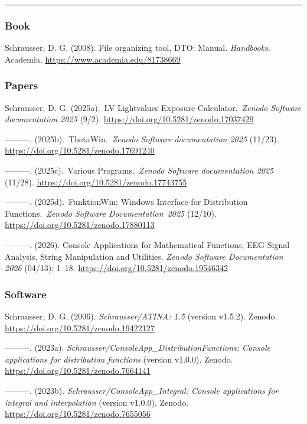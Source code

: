 \documentclass[
]{article}
\begin{document}
\begin{center}\rule{0.5\linewidth}{0.5pt}\end{center}

\hypertarget{book-1}{%
\subsubsection{Book}\label{book-1}}

Schrausser, D. G. (2008). File organizing tool, DTO: Manual.
\emph{Handbooks}. Academia. \url{https://www.academia.edu/81738669}

\hypertarget{papers-4}{%
\subsubsection{Papers}\label{papers-4}}

Schrausser, D. G. (2025a).~LV Lightvalues Exposure
Calculator.~\emph{Zenodo Software documentation 2025} (9/2).
\url{https://doi.org/10.5281/zenodo.17037429}

---------. (2025b).~ThetaWin.~\emph{Zenodo Software documentation 2025}
(11/23). \url{https://doi.org/10.5281/zenodo.17691240}

---------. (2025c).~Various Programs.~\emph{Zenodo Software
documentation 2025} (11/28).
\url{https://doi.org/10.5281/zenodo.17743755}

---------. (2025d).~FunktionWin: Windows Interface for Distribution
Functions.~\emph{Zenodo Software Documentation~2025} (12/10).
\url{https://doi.org/10.5281/zenodo.17880113}

---------. (2026). Console Applications for Mathematical Functions, EEG
Signal Analysis, String Manipulation and Utilities. \emph{Zenodo
Software Documentation 2026} (04/13): 1--18.
\url{https://doi.org/10.5281/zenodo.19546342}

\hypertarget{software-5}{%
\subsubsection{Software}\label{software-5}}

Schrausser, D. G. (2006). \emph{Schrausser/ATINA: 1.5} (version v1.5.2).
Zenodo. \url{https://doi.org/10.5281/zenodo.19422127}

---------. (2023a). \emph{Schrausser/ConsoleApp\_DistributionFunctions:
Console applications for distribution functions} (version v1.0.0).
Zenodo. \url{https://doi.org/10.5281/zenodo.7664141}

---------. (2023b). \emph{Schrausser/ConsoleApp\_Integral: Console
applications for integral and interpolation} (version v1.0.0). Zenodo.
\url{https://doi.org/10.5281/zenodo.7655056}
\end{document}
